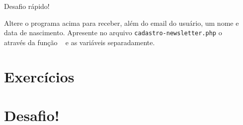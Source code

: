 \begin{framed}
{\Large Desafio rápido!}

Altere o programa acima para receber, além do email do usuário, um nome e
data de nascimento. Apresente no arquivo \texttt{cadastro-newsletter.php} 
o \tipoarray~ \variavelget~ através da função \funcaoprintr~ e as variáveis
separadamente.
\end{framed}

\section{Exercícios}
\label{cap7-exercicios}

\section{Desafio!}
\label{cap7-desafio}